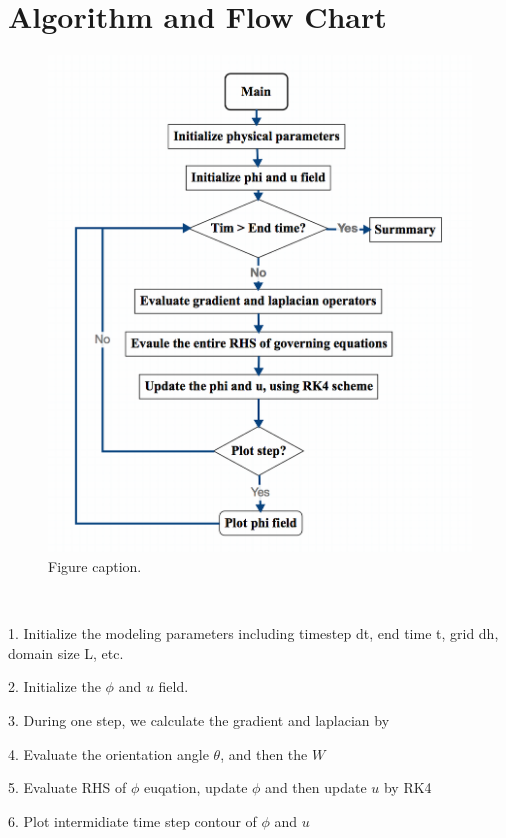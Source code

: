 \documentclass{article}
\begin{document}
\section{Algorithm and Flow Chart}
\begin{figure}[h]
\begin{center}
\includegraphics[width=1\textwidth]{flowchart_v_1} %
\caption{Figure caption.}
\end{center}
\end{figure}
\par \ 
\par 1. Initialize the modeling parameters including timestep dt, end time t, grid dh, domain size L, etc. 
\par 2. Initialize the $\phi$ and $u$ field.
\par 3. During one step, we calculate the gradient and laplacian by 
\par 4. Evaluate the orientation angle $\theta$, and then the $W$
\par 5. Evaluate RHS of $\phi$ euqation, update $\phi$ and then update $u$ by RK4
\par 6. Plot intermidiate time step contour of  $\phi$ and $u$
  
\end{document}
